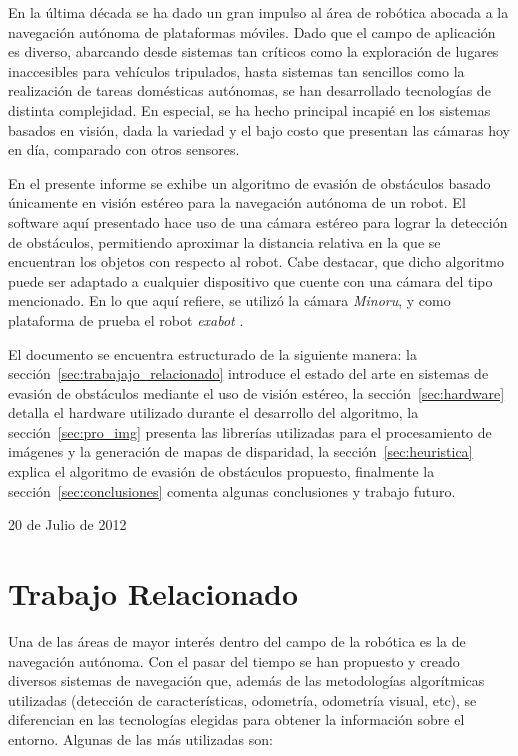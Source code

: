 \documentclass[journal]{IEEEtran}
\begin{document}
En la \'ultima d\'ecada se ha dado un gran impulso al \'area de rob\'otica abocada a la navegaci\'on aut\'onoma de plataformas m\'oviles. Dado que el campo de aplicaci\'on es diverso, abarcando desde sistemas tan cr\'iticos como la exploraci\'on de lugares inaccesibles para veh\'iculos tripulados, hasta sistemas tan sencillos como la realizaci\'on de tareas dom\'esticas aut\'onomas, se han desarrollado tecnolog\'ias de distinta complejidad. En especial, se ha hecho principal incapi\'e en los sistemas basados en visi\'on, dada la variedad y el bajo costo que presentan las c\'amaras hoy en d\'ia, comparado con otros sensores.

En el presente informe se exhibe un algoritmo de evasi\'on de obst\'aculos basado \'unicamente en visi\'on est\'ereo para la navegaci\'on aut\'onoma de un robot. El software aqu\'i presentado hace uso de una c\'amara est\'ereo para lograr la detecci\'on de obst\'aculos, permitiendo aproximar la distancia relativa en la que se encuentran los objetos con respecto al robot. Cabe destacar, que dicho algoritmo puede ser adaptado a cualquier dispositivo que cuente con una c\'amara del tipo mencionado. En lo que aqu\'i refiere, se utiliz\'o la c\'amara \emph{Minoru}, y como plataforma de prueba el robot \emph{exabot} \cite{DPSC09}.


El documento se encuentra estructurado de la siguiente manera: la secci\'on~\ref{sec:trabajajo_relacionado} introduce el estado del arte en sistemas de evasi\'on de obst\'aculos mediante el uso de visi\'on est\'ereo, la secci\'on~\ref{sec:hardware} detalla el hardware utilizado durante el desarrollo del algoritmo, la secci\'on~\ref{sec:pro_img} presenta las librer\'ias utilizadas para el procesamiento de im\'agenes y la generaci\'on de mapas de disparidad, la secci\'on~\ref{sec:heuristica} explica el algoritmo de evasi\'on de obst\'aculos propuesto, finalmente la secci\'on~\ref{sec:conclusiones} comenta algunas conclusiones y trabajo futuro.
\medskip

\hfill 20 de Julio de 2012

\section{Trabajo Relacionado}
\label{sec:trabajo_relacionado}

Una de las \'areas de mayor inter\'es dentro del campo de la rob\'otica es la de navegaci\'on aut\'onoma. Con el pasar del tiempo se han propuesto y creado diversos sistemas de navegaci\'on que, adem\'as de las metodolog\'ias algor\'itmicas utilizadas (detecci\'on de caracter\'isticas, odometr\'ia, odometr\'ia visual, etc), se diferencian en las tecnolog\'ias elegidas para obtener la informaci\'on sobre el entorno. Algunas de las m\'as utilizadas son:
\end{document}
